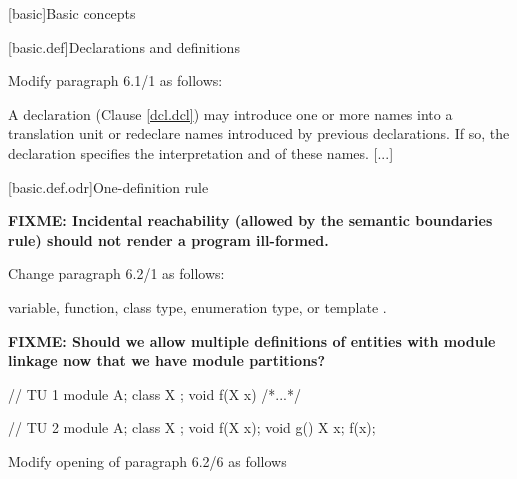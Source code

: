 \setcounter{chapter}{5}
[basic]{Basic concepts}

[basic.def]{Declarations and definitions}

Modify paragraph 6.1/1 as follows:

\begin{std.txt}
  \resetalinea[0]
  \alinea
  A declaration (Clause \ref{dcl.dcl}) may introduce one or more names into a
  translation unit or redeclare names introduced by previous declarations.
  If so, the declaration specifies the interpretation and
   of these names.
  [...]
  \end{std.txt}

[basic.def.odr]{One-definition rule}

\textbf{\color{red}FIXME: Incidental reachability (allowed
by the semantic boundaries rule) should not render a program
ill-formed.}

Change paragraph 6.2/1 as follows:
\begin{std.txt}
  \resetalinea[0]
  \alinea
  variable, function, class type, enumeration type, or template
  .
\end{std.txt}

\textbf{\color{red}FIXME: Should we allow multiple definitions
of entities with module linkage now that we have module partitions?}

\begin{example}
\begin{codeblock}
// TU 1
module A;
class X {};
void f(X x) { /*...*/ }

// TU 2
module A;
class X {};
void f(X x);
void g() { X x; f(x); }
\end{codeblock}
\end{example}

Modify opening of paragraph 6.2/6 as follows

